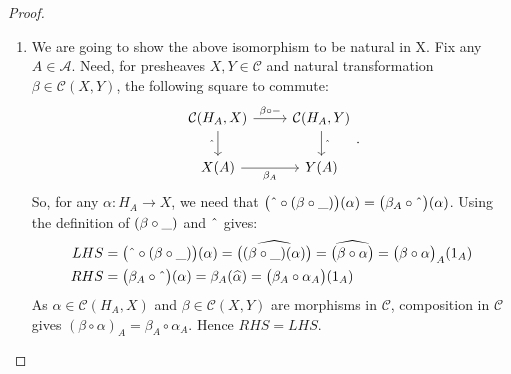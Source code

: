 \documentclass[a4paper]{article}
\theoremstyle{definition}
\begin{document}
\begin{proof}
\begin{enumerate}[label=\Roman*]
					\begin{enumerate}[label=(\roman*)]
						\item We are going to show the above isomorphism to be natural in X.
							Fix any $A \in \mathcal{A}$. Need, for
							presheaves $X,Y \in \mathcal{C}$ and
							natural transformation $\beta \in \mathcal{C} (X,Y)$, the following square to commute:
							\begin{equation*}
								\begin{tikzcd}
									\mathcal{C}(H_A,X) \arrow[swap]{d}{ \string ^}
									\arrow{r}{\beta \circ -}
			& \mathcal{C}(H_A,Y) \arrow{d}{\string ^}\\
			X(A) \arrow[swap]{r}{\beta_A}
			& Y(A)
								\end{tikzcd}.
							\end{equation*}
							So, for any $\alpha:H_A \to X$, we need that
							$\big( \string ^ \circ (\beta \circ \string _ )\big)(\alpha) = \big( \beta_A \circ \string ^
							\big)(\alpha)$. Using the definition of
							$(\beta \circ \string _ )$ and $\string ^$ gives:
							\begin{align}
								LHS & = \big( \string ^ \circ (\beta \circ \string _ ) \big)(\alpha) =
								\widehat{\big(  (\beta \circ \string _ )(\alpha)\big)}=
								\widehat{\big(  \beta \circ \alpha\big)}
								=\big(  \beta \circ \alpha\big)_A(1_A) \\
								RHS & = \big( \beta_A \circ \string ^ \big)(\alpha)
								= \beta_A (\widehat{\alpha}) =\big( \beta_A \circ \alpha_A\big)(1_A)
							\end{align}
							As $\alpha \in \mathcal{C} (H_A,X)$ and $\beta \in \mathcal{C}(X,Y)$
							are morphisms in $\mathcal{C}$, composition in $\mathcal{C}$ gives
							$(\beta \circ \alpha)_A = \beta_A \circ \alpha_A$. Hence $RHS=LHS$.


\end{enumerate}
\end{enumerate}
\end{proof}
\end{document}
